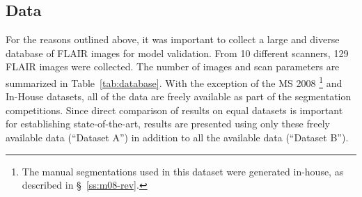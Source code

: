 \subsection{Data}\label{ss:data}
For the reasons outlined above,
it was important to collect a large and diverse database of FLAIR images for model validation.
From 10 different scanners, 129 FLAIR images were collected.
The number of images and scan parameters are summarized in Table~\ref{tab:database}.
With the exception of the MS 2008%
\footnote{The manual segmentations used in this dataset were generated in-house,
  as described in \S~\ref{ss:m08-rev}.}
and In-House datasets,
all of the data are freely available as part of the segmentation competitions.
Since direct comparison of results on equal datasets is important for establishing state-of-the-art, 
results are presented using only these freely available data (``Dataset A'')
in addition to all the available data (``Dataset B'').
\par
